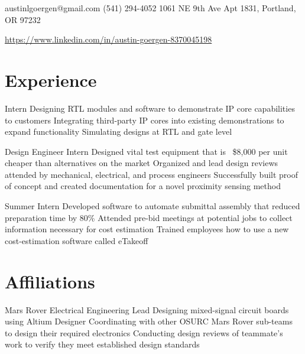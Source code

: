 \documentclass{my_cv}
\begin{document}

\contact
{austinlgoergen@gmail.com}
{(541) 294-4052}
{1061 NE 9th Ave Apt 1831, Portland, OR 97232}

\vspace{-0.5em}

\begin{center}
\href{https://www.linkedin.com/in/austin-goergen-8370045198}{https://www.linkedin.com/in/austin-goergen-8370045198}
\end{center}

\section{Experience}

\vspace{-0.75em}
Intern
\workitems
    {Designing RTL modules and software to demonstrate IP core capabilities to customers}
    {Integrating third-party IP cores into existing demonstrations to expand functionality}
    {Simulating designs at RTL and gate level}


\vspace{-0.75em}
Design Engineer Intern
\workitems
    {Designed vital test equipment that is ~\$8,000 per unit cheaper than alternatives on the market}
    {Organized and lead design reviews attended by mechanical, electrical, and process engineers}
    {Successfully built proof of concept and created documentation for a novel proximity sensing method}

\vspace{-0.75em}
Summer Intern
\workitems
    {Developed software to automate submittal assembly that reduced preparation time by 80\%}
    {Attended pre-bid meetings at potential jobs to collect information necessary for cost estimation}
    {Trained employees how to use a new cost-estimation software called eTakeoff}

\section{Affiliations}

\vspace{-0.75em}
Mars Rover Electrical Engineering Lead
\workitems
    {Designing mixed-signal circuit boards using Altium Designer}
    {Coordinating with other OSURC Mars Rover sub-teams to design their required electronics}
    {Conducting design reviews of teammate's work to verify they meet established design standards}
\end{document}
